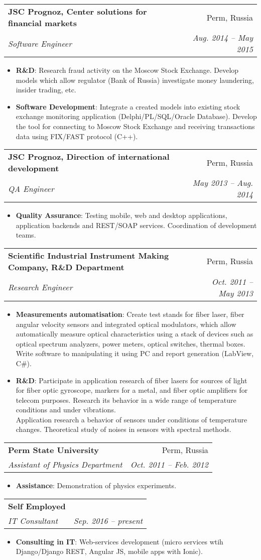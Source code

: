 \documentclass[letterpaper,11pt]{article}
\makeatletter
\newcommand{\resumeItem}[2]{
  \item\small{
    \textbf{#1}{: #2 \vspace{-2pt}}
  }
}
\newcommand{\resumeSubheading}[4]{
  \vspace{-1pt}\item
    \begin{tabular*}{0.97\textwidth}{l@{\extracolsep{\fill}}r}
      \textbf{#1} & #2 \\
      \textit{\small#3} & \textit{\small #4} \\
    \end{tabular*}\vspace{-5pt}
}
\newcommand{\resumeItemListStart}{\begin{itemize}}
\newcommand{\resumeItemListEnd}{\end{itemize}\vspace{-5pt}}
\makeatother
\begin{document}
    \resumeSubheading
      {JSC Prognoz, Center solutions for financial markets}{Perm, Russia}
      {Software Engineer}{Aug. 2014 -- May 2015}
      \resumeItemListStart
        \resumeItem{R\&D}
          {Research fraud activity on the Moscow Stock Exchange. Develop models which allow regulator (Bank of Russia) investigate money laundering, insider trading, etc.}
        \resumeItem{Software Development}
          {Integrate a created models into existing stock exchange monitoring application (Delphi/PL/SQL/Oracle Database). Develop the tool for connecting to Moscow Stock Exchange and receiving transactions data using FIX/FAST protocol (C++).}
      \resumeItemListEnd

    \resumeSubheading
      {JSC Prognoz, Direction of international development}{Perm, Russia}
      {QA Engineer}{May 2013 -- Aug. 2014}
      \resumeItemListStart
        \resumeItem{Quality Assurance}
          {Testing mobile, web and desktop applications, application backends and REST/SOAP services. Coordination of development teams.}
      \resumeItemListEnd

    \resumeSubheading
      {Scientific Industrial Instrument Making Company, R\&D Department}{Perm, Russia}
      {Research Engineer}{Oct. 2011 -- May 2013}
      \resumeItemListStart
        \resumeItem{Measurements automatisation}
          {Create test stands for fiber laser, fiber angular velocity sensors and integrated optical modulators, which allow automatically measure optical characteristics using a stack of devices such as optical spectrum analyzers, power meters, optical switches, thermal boxes. Write software to manipulating it using PC and report generation (LabView, C\#).}
        \resumeItem{R\&D}
          {Participate in application research of fiber lasers for sources of light for fiber optic gyroscope, markers for a metal, and fiber optic amplifiers for telecom purposes. Research its behavior in a wide range of temperature conditions and under vibrations. \\
Application research a behavior of sensors under conditions of temperature changes. Theoretical study of noises in sensors with spectral methods.}
      \resumeItemListEnd

    \resumeSubheading
      {Perm State University}{Perm, Russia}
      {Assistant of Physics Department}{Oct. 2011 -- Feb. 2012}
      \resumeItemListStart
        \resumeItem{Assistance}
          {Demonstration of physics experiments.}
    \resumeItemListEnd

    \resumeSubheading
      {Self Employed}{}
      {IT Consultant}{Sep. 2016 -- present}
      \resumeItemListStart
        \resumeItem{Consulting in IT}
          {Web-services development (micro services wtih Django/Django REST, Angular JS, mobile apps with Ionic).}
    \resumeItemListEnd
\end{document}

